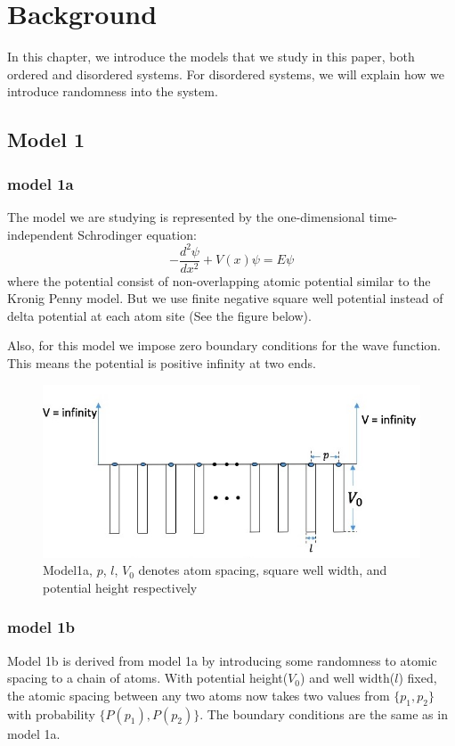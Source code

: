 \chapter{Background}\label{Ch:Background}
In this chapter, we introduce the models that we study in this paper, both ordered and disordered systems. For disordered systems, we will explain how we introduce randomness into the system. 



\section{Model 1}\label{model:model1}
\subsection{model 1a}

The model we are studying is represented by the one-dimensional time-independent Schrodinger equation: 
\begin{equation} \label{eq:2.1}
-\frac{d^2\psi}{dx^2}+V(x)\psi=E\psi
\end{equation}
where the potential consist of non-overlapping atomic potential similar to the Kronig Penny model. But we use finite negative square well potential instead of delta potential at each atom site (See the figure below).

Also, for this model we impose zero boundary conditions for the wave function. This means the potential is positive infinity at two ends. 

\begin{figure}[h]
\centering
\includegraphics[scale=0.75]{Graphics/square_potential_problem.jpeg}
\caption{Model1a, $p$, $l$, $V_0$ denotes atom spacing, square well width, and potential height respectively}
\label{fig:net}
\end{figure}

\newpage
\subsection{model 1b}
Model 1b is derived from model 1a by introducing some randomness to atomic spacing to a chain of atoms. With potential height($V_0$) and well width($l$) fixed, the atomic spacing between any two atoms now takes two values from ${\{p_1,p_2\}}$ with probability ${\{P(p_1),P(p_2)\}}$. The boundary conditions are the same as in model 1a.
